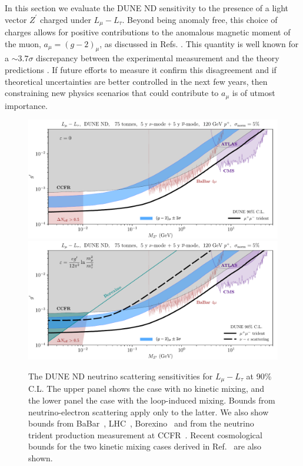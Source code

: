 In this section we evaluate the DUNE ND sensitivity to the presence of a light
vector $Z^\prime$ charged under $L_{\mu} - L_{\tau}$. Beyond being anomaly free, this choice of charges allows for positive contributions to the anomalous magnetic moment of the muon, $a_\mu = (g-2)_{\mu}$, as discussed in Refs. \cite{Baek:2001kca,Pospelov:2008zw,Kamada:2015era,Araki:2015mya,Kamada:2018zxi}. This quantity is well known for a $\sim 3.7\sigma$ discrepancy between the experimental measurement \cite{Bennett:2006fi} and the theory predictions \cite{Blum:2018mom,Keshavarzi:2018mgv}. If future efforts to measure it \cite{Grange:2015fou} confirm this disagreement and if theoretical uncertainties are better controlled in the next few years, then constraining new physics scenarios that could contribute to $a_\mu$ is of utmost importance. 
%
\begin{figure}[h!]
\centering
\includegraphics[width=\textwidth]{lmultau_nokm.pdf}\\
\includegraphics[width=\textwidth]{lmultau_km.pdf}
\caption[DUNE sensitivity to the $L_\mu-L_\tau$ model.]{The DUNE ND neutrino scattering sensitivities for $L_\mu - L_\tau$ at 90\% C.L. The upper panel shows the case with no kinetic mixing, and the lower panel the case with the loop-induced mixing. Bounds from neutrino-electron scattering apply only to the latter. We also show bounds from BaBar~\cite{TheBABAR:2016rlg}, LHC~\cite{Aad:2014wra}, Borexino~\cite{Kaneta:2016uyt} and from the neutrino trident production measurement at CCFR~\cite{Mishra:1991bv,Altmannshofer2014}. Recent cosmological bounds for the two kinetic mixing cases derived in Ref.~\cite{Escudero:2019gzq} are also shown. \label{fig:Lmu_Ltau}}
\end{figure}
%

